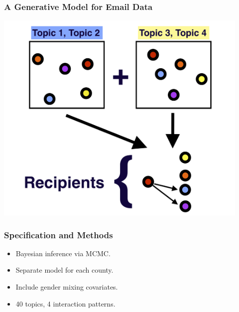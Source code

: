 \documentclass[xcolor={table}, fleqn]{beamer}
\newenvironment{changemargin}[2]{%
  \begin{list}{}{%
    \setlength{\topsep}{0pt}%
    \setlength{\leftmargin}{#1}%
    \setlength{\rightmargin}{#2}%
    \setlength{\listparindent}{\parindent}%
    \setlength{\itemindent}{\parindent}%
    \setlength{\parsep}{\parskip}%
  }%
  \item[]}{\end{list}}
\begin{document}
\begin{frame}\frametitle{A Generative Model for Email Data}
	\begin{changemargin}{-1cm}{ -1cm}
    \centering
	\includegraphics[width=0.92\textwidth]{images/Gen_Proc_3.png}
	\end{changemargin} 
\end{frame}

\begin{frame}\frametitle{Specification and Methods}
	\LARGE
	\begin{itemize}
		\item Bayesian inference via MCMC.
		\vspace*{.4in}
		\item Separate model for each county.
		\vspace*{.4in}
		\item Include gender mixing covariates.
		\vspace*{.4in}
		\item 40 topics, 4 interaction patterns.
	\end{itemize}
\end{frame}
\end{document}
